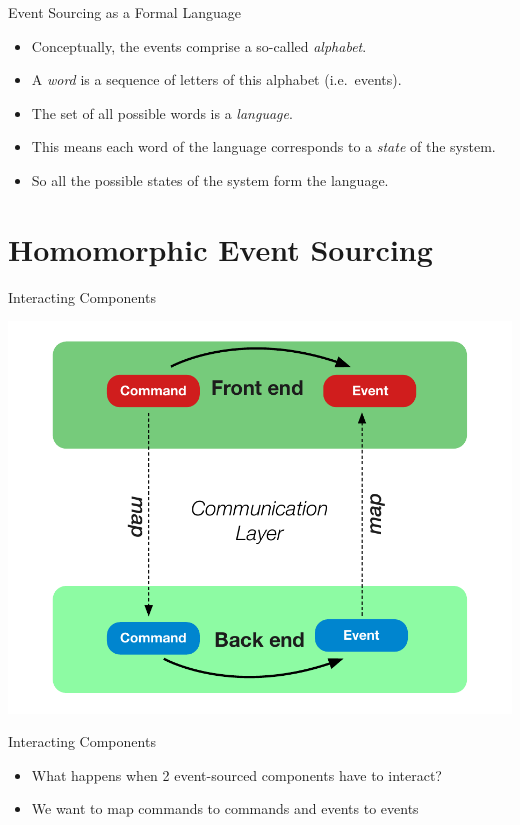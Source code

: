 \begin{frame}[fragile]{Event Sourcing as a Formal Language}

\begin{itemize}[<+->]
\item Conceptually, the events comprise a so-called \textit{alphabet}.
\item A \textit{word} is a sequence of letters of this alphabet (i.e.~events).
\item The set of all possible words is a \textit{language}.
\item This means each word of the language corresponds to a \textit{state} of the system.
\item So all the possible states of the system form the language.
\end{itemize}

\end{frame}

\part{Homomorphic Event Sourcing}

\begin{frame}[fragile]{Interacting Components}
\begin{center}
\includegraphics[height=.8\textheight]{./images/interaction-loop.pdf}
\end{center}
\end{frame}

\begin{frame}[fragile]{Interacting Components}
  \begin{itemize}
  \item What happens when 2 event-sourced components have to interact?
  \item We want to map commands to commands and events to events
  \end{itemize}
\end{frame}


